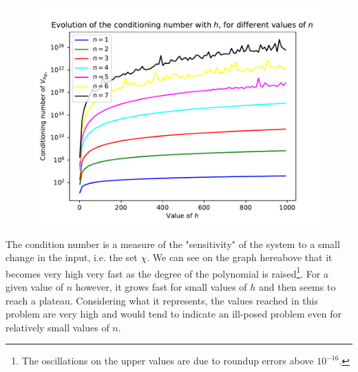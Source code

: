 \documentclass[11pt]{article}
\begin{document}
\begin{tcolorbox}[breakable,
                  colback=white,
                  colframe=white!75!black,
                  title={Study the effect of scaling (affine transformation with \(A = hI\), \(h > 0\) and \(b = 0\)) on the conditioning of the Vandermonde matrix. More precisely, display on the same graph, for different values of \(n\ge 0\), the condition numbers of \(V_{h\chi_n}\) as a function of \(h\), with a logarithmic y-scale.}
                 ]
    \begin{figure}[H]
        \centering
        \includegraphics[width=0.7\linewidth]{homework1/scaling.pdf}
    \end{figure}
    The condition number is a measure of the "sensitivity" of the system to a small change in the input, i.e. the set \(\chi\). We can see on the graph hereabove that it becomes very high very fast as the degree of the polynomial is raised\footnote{The oscillations on the upper values are due to roundup errors above \(10^{-16}\).}. For a given value of \(n\) however, it grows fast for small values of \(h\) and then seems to reach a plateau. Considering what it represents, the values reached in this problem are very high and would tend to indicate an ill-posed problem even for relatively small values of \(n\). 
\end{tcolorbox}
\end{document}
